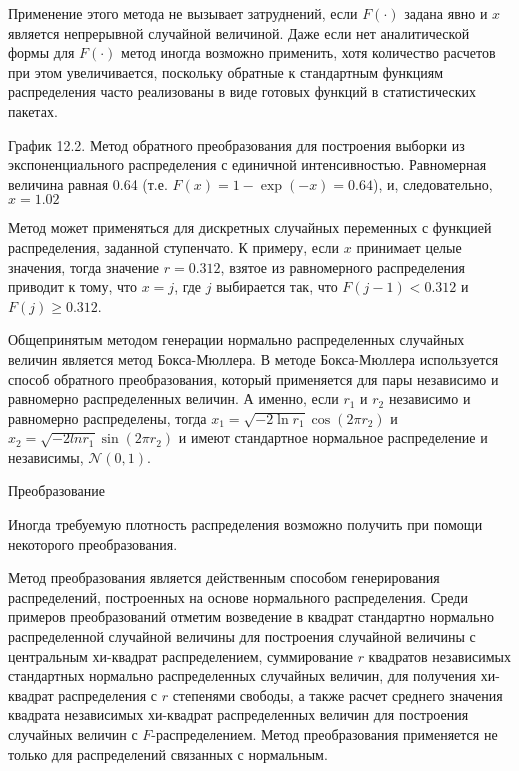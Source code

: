 Применение этого метода не вызывает затруднений, если $F(\cdot)$ задана явно и $x$ является непрерывной случайной величиной. Даже если нет аналитической формы для $F(\cdot)$ метод иногда возможно применить, хотя количество расчетов при этом увеличивается, поскольку обратные к  стандартным функциям распределения часто реализованы в виде готовых функций в статистических пакетах.

\vspace{2cm}

График 12.2. Метод обратного преобразования для построения выборки из экспоненциального  распределения с единичной интенсивностью. Равномерная величина равная 0.64 (т.е. $F(x) = 1- \exp(-x) = 0.64$), и, следовательно, $x = 1.02$

Метод может применяться для дискретных случайных переменных с функцией распределения, заданной ступенчато. К примеру, если $x$ принимает целые значения, тогда значение $r=0.312$, взятое из равномерного распределения приводит к тому, что $x=j$, где $j$ выбирается так, что $F(j-1)<0.312$ и $F(j)\geq 0.312$.

Общепринятым методом генерации нормально распределенных случайных величин является метод Бокса-Мюллера. В методе Бокса-Мюллера используется способ обратного преобразования, который применяется для пары независимо и равномерно распределенных величин. А именно, если $r_1$ и $r_2$ независимо и равномерно распределены, тогда $x_1=\sqrt{-2\ln{r_1}}\cos(2\pi{r_2})$ и $x_2=\sqrt{-2ln{r_1}}\sin(2\pi{r_2})$ и имеют стандартное нормальное распределение и независимы, $\mathcal{N}(0,1)$.

\begin{center}
Преобразование
\end{center}

Иногда требуемую плотность распределения возможно получить при помощи некоторого преобразования. 

Метод преобразования является действенным способом генерирования распределений, построенных на основе нормального распределения. Среди примеров преобразований отметим возведение в квадрат стандартно нормально распределенной случайной величины для построения случайной величины с центральным хи-квадрат распределением, суммирование $r$ квадратов независимых стандартных нормально распределенных случайных величин, для получения хи-квадрат распределения с $r$ степенями свободы,  а также расчет среднего значения квадрата независимых хи-квадрат распределенных величин для построения случайных величин с $F$-распределением. Метод преобразования применяется не только для распределений связанных с нормальным. 

